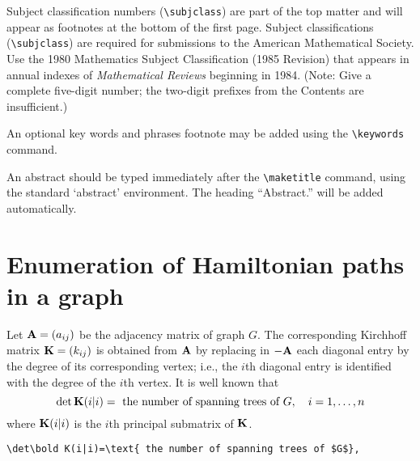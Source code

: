 Subject classification numbers (\verb=\subjclass=) are part of the top
matter and will appear as footnotes at the bottom of the first page. 
Subject classifications (\verb=\subjclass=) are required for
submissions to the American Mathematical Society.  Use the 1980
Mathematics Subject Classification (1985 Revision) that appears in
annual indexes of {\it Mathematical Reviews\/} beginning in 1984. 
(Note: Give a complete five-digit number; the two-digit prefixes from
the Contents are insufficient.)

An optional key words and phrases footnote may be added using
the \verb=\keywords= command.

An abstract should be typed immediately after the \verb=\maketitle=
command, using the standard `abstract' environment.  The heading
``{\sc Abstract.}'' will be added automatically.

\section{Enumeration of Hamiltonian paths in a graph}
Let $\bold A=(a_{ij})$ be the adjacency matrix of
graph $G$. 
The corresponding Kirchhoff matrix $\bold K=(k_{ij})$ is obtained from 
$\bold A$ by replacing in $-\bold A$ each diagonal entry by the degree of its
corresponding vertex; i.e., the $i$th diagonal entry is identified
with the degree of the $i$th vertex. It is well known that
\begin{equation}
\det\bold K(i|i)=\text{ the number of spanning trees of $G$},
\quad i=1,\dots,n
\end{equation}
where $\bold K(i|i)$ is the $i$th principal submatrix of $\bold K$.
%
\begin{verbatim}
\det\bold K(i|i)=\text{ the number of spanning trees of $G$},
\end{verbatim}

